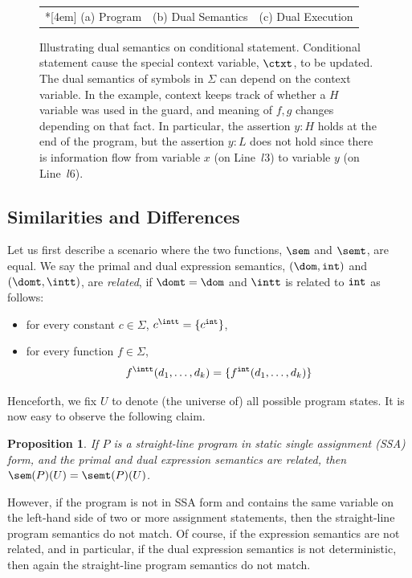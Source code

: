 \documentclass[preprint]{sig-alternate-05-2015}
\newtheorem{proposition}{Proposition}
\def\int{{\tt{int}}}
\def\Sig{{\Sigma}}
\begin{document}
{\begin{figure}[htp]
\begin{tabular}{c|c|c}
    \\*[4em]
    (a) Program & (b) Dual Semantics & (c) Dual Execution
  \end{tabular}
  \caption{Illustrating dual semantics on conditional statement. Conditional statement cause the special context variable, $\ctxt$, to be updated. The dual semantics of symbols in $\Sig$ can depend on the context variable. In the example, context keeps track of whether a $H$ variable was used in the guard, and meaning of $f,g$ changes depending on that fact. In particular, the assertion $y:H$ holds at the end of the program, but the assertion $y:L$ does not hold since there is information flow from variable $x$ (on Line~$l3$) to variable $y$ (on Line~$l6$).}\label{fig:ex2}
\end{figure}

\subsection{Similarities and Differences}

Let us first describe a scenario where
the two functions, $\sem$ and $\semt$,
are equal.
We say the primal and dual expression
semantics, $(\dom,\int)$ and $(\domt,\intt)$,
are {\em{related}}, if
$\domt = \dom$ and $\intt$ is related to
$\int$ as follows:
\begin{itemize}
  \item for every constant $c\in\Sig$,
    $c^\intt = \{ c^\int \}$,
  \item for every function $f\in\Sig$,
    $$
    f^\intt(d_1,\ldots,d_k) = \{ f^\int(d_1,\ldots,d_k) \}
    $$
\end{itemize}
Henceforth,
we fix $U$ to denote (the universe of) all
possible program states.
It is now easy to observe the following claim.
\begin{proposition}
If $P$ is a straight-line program in
static single assignment (SSA) form,
and the primal and dual expression semantics
are related, then
$\sem(P)(U) = \semt(P)(U)$.
\end{proposition}

However, if the program is not in SSA form and
contains the same variable on the left-hand side of
two or more assignment statements, then the
straight-line program semantics do not match.
Of course, if the expression semantics are not related,
and in particular, if the dual expression semantics is
not deterministic,
then again the straight-line program semantics do not
match.

\endignore}
\end{document}
